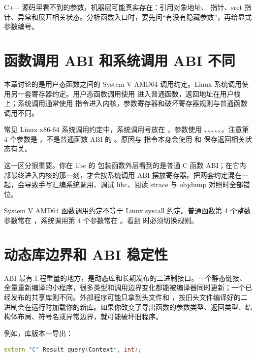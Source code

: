 \begin{keyidea}
C++ 源码里看不到的参数，机器层可能真实存在：引用对象地址、 指针、sret 指针、异常和展开相关状态。分析函数入口时，要先问“有没有隐藏参数”，再给显式参数编号。
\end{keyidea}

\section{函数调用 ABI 和系统调用 ABI 不同}

本章讨论的是用户态函数之间的 System V AMD64 调用约定。Linux 系统调用使用另一套寄存器约定。用户态函数调用使用  进入普通函数，返回地址在用户栈上；系统调用通常使用  指令进入内核，参数寄存器和破坏寄存器规则与普通函数调用不同。

常见 Linux x86-64 系统调用约定中，系统调用号放在 ，参数使用 、、、、、。注意第 4 个参数是 ，不是普通函数 ABI 的 。原因与  指令本身会使用  和  保存返回相关状态有关。

这一区分很重要。你在 libc 的  包装函数外层看到的是普通 C 函数 ABI；在它内部最终进入内核的那一刻，才会按系统调用 ABI 摆放寄存器。把两套约定混在一起，会导致手写汇编系统调用、调试 libc、阅读 strace 与 objdump 对照时全部错位。

\begin{warningbox}
System V AMD64 函数调用约定不等于 Linux syscall 约定。普通函数第 4 个整数参数常在 ，系统调用第 4 个参数常在 。看到  时必须切换规则。
\end{warningbox}

\section{动态库边界和 ABI 稳定性}

ABI 最有工程重量的地方，是动态库和长期发布的二进制接口。一个静态链接、全量重新编译的小程序，很多类型和调用边界变化都能被编译器同时更新；一个已经发布的共享库则不同。外部程序可能只拿到头文件和 ，按旧头文件编译好的二进制会在运行时加载你的新库。如果你改变了导出函数的参数类型、返回类型、结构体布局、符号名或异常边界，就可能破坏旧程序。

例如，库版本一导出：

\begin{lstlisting}[language=C++]
extern "C" Result query(Context*, int);
\end{lstlisting}

